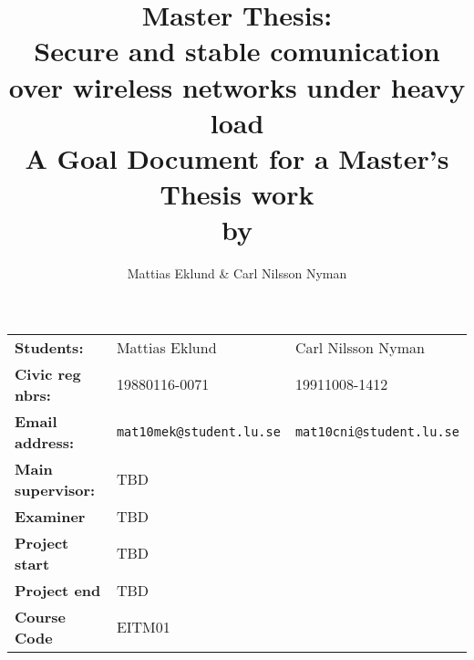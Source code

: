 \documentclass[a4paper]{article}
\title{Master Thesis:\\\Large{Secure and stable comunication over wireless
		networks under heavy load}
\\\large{A Goal Document for a Master's Thesis work\\by}}
\author{Mattias Eklund \& Carl Nilsson Nyman}
\date{}
\begin{document}
\maketitle
\pagebreak

\begin{tabular}{lll}
	\textbf{Students:} & Mattias Eklund & Carl Nilsson Nyman \\
	\textbf{Civic reg nbrs:} & 19880116-0071& 19911008-1412\\
	\textbf{Email address:} & \texttt{mat10mek@student.lu.se}
	& \texttt{mat10cni@student.lu.se} \\
	\textbf{Main supervisor:} & TBD & \\
	\textbf{Examiner} & TBD & \\
	\textbf{Project start} & TBD & \\
	\textbf{Project end} & TBD & \\
	\textbf{Course Code} & EITM01 & 
\end{tabular}

%
%
%
%
\end{document}
